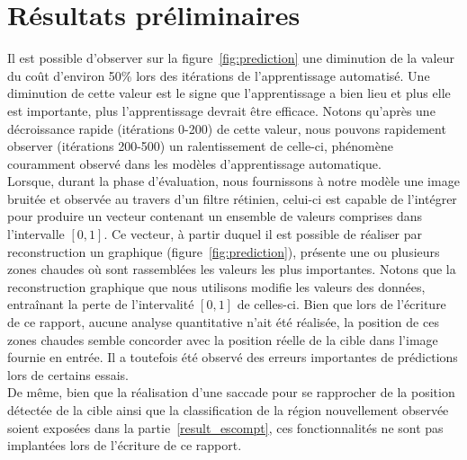 \section{Résultats préliminaires}

Il est possible d'observer sur la figure~\ref{fig:prediction} une diminution de la valeur du coût d'environ 50\% lors des itérations de l'apprentissage automatisé. 
Une diminution de cette valeur est le signe que l'apprentissage a bien lieu et plus elle est importante, plus l'apprentissage devrait être efficace.
Notons qu'après une décroissance rapide (itérations 0-200) de cette valeur, nous pouvons rapidement observer (itérations 200-500) un ralentissement de celle-ci, phénomène couramment observé dans les modèles d'apprentissage automatique. \\
Lorsque, durant la phase d'évaluation, nous fournissons à notre modèle une image bruitée et observée au travers d'un filtre rétinien, celui-ci est capable de l'intégrer pour produire un vecteur contenant un ensemble de valeurs comprises dans l'intervalle $[0,1]$.
Ce vecteur, à partir duquel il est possible de réaliser par reconstruction un graphique (figure~\ref{fig:prediction}), présente une ou plusieurs zones chaudes où sont rassemblées les valeurs les plus importantes. 
Notons que la reconstruction graphique que nous utilisons modifie les valeurs des données, entraînant la perte de l'intervalité $[0,1]$ de celles-ci.
Bien que lors de l'écriture de ce rapport, aucune analyse quantitative n'ait été réalisée, la position de ces zones chaudes semble concorder avec la position réelle de la cible dans l'image fournie en entrée.
Il a toutefois été observé des erreurs importantes de prédictions lors de certains essais. \\
De même, bien que la réalisation d'une saccade pour se rapprocher de la position détectée de la cible ainsi que la classification de la région nouvellement observée soient exposées dans la partie~\ref{result_escompt}, ces fonctionnalités ne sont pas implantées lors de l'écriture de ce rapport.
